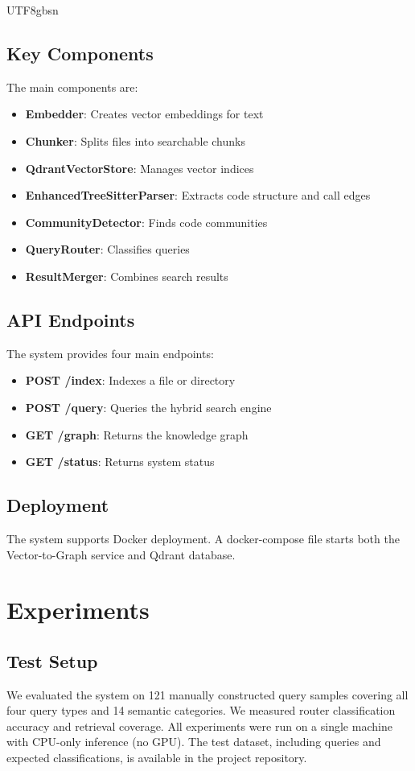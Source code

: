 \documentclass[11pt]{article}
\begin{document}
\begin{CJK*}{UTF8}{gbsn}
\subsection{Key Components}

The main components are:

\begin{itemize}
    \item \textbf{Embedder}: Creates vector embeddings for text
    \item \textbf{Chunker}: Splits files into searchable chunks
    \item \textbf{QdrantVectorStore}: Manages vector indices
    \item \textbf{EnhancedTreeSitterParser}: Extracts code structure and call edges
    \item \textbf{CommunityDetector}: Finds code communities
    \item \textbf{QueryRouter}: Classifies queries
    \item \textbf{ResultMerger}: Combines search results
\end{itemize}

\subsection{API Endpoints}

The system provides four main endpoints:

\begin{itemize}
    \item \textbf{POST /index}: Indexes a file or directory
    \item \textbf{POST /query}: Queries the hybrid search engine
    \item \textbf{GET /graph}: Returns the knowledge graph
    \item \textbf{GET /status}: Returns system status
\end{itemize}

\subsection{Deployment}
The system supports Docker deployment. A docker-compose file starts both the Vector-to-Graph service and Qdrant database.

\section{Experiments}

\subsection{Test Setup}
We evaluated the system on 121 manually constructed query samples covering all four query types and 14 semantic categories. We measured router classification accuracy and retrieval coverage. All experiments were run on a single machine with CPU-only inference (no GPU). The test dataset, including queries and expected classifications, is available in the project repository.


\end{CJK*}
\end{document}
